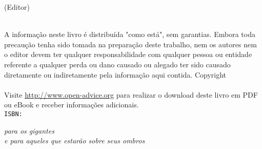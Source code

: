 \thispagestyle{empty}
\booktitle
\newpage
\newpage
\begin{titlepage}
\begin{flushright}
\bookeditor{} (Editor)\\
\vspace{10em}
{\Huge\bfseries\sffamily\booktitle}\\
\vspace{2em}
{\normalsize\sffamily\booksubtitle}
\end{flushright}
\end{titlepage}
\thispagestyle{empty}
A informação neste livro é distribuída "como está", sem garantias. Embora toda precaução tenha sido tomada na preparação deste trabalho, nem os autores nem o editor devem ter qualquer responsabilidade com qualquer pessoa ou entidade referente a qualquer perda ou dano causado ou alegado ter sido causado diretamente ou indiretamente pela informação aqui contida.%
\vfill
Copyright \textcopyright{} \bookyear{} \bookauthors\\
\newline
{}
\newline \\
Visite \url{http://www.open-advice.org} para realizar o download deste livro em PDF ou eBook e receber informações adicionais.
\newline \\
{\tt ISBN: \bookisbn}%
\newpage
\thispagestyle{empty}
\vspace*{2cm}
\begin{flushright}
{\Large\itshape para os gigantes\\e para aqueles que estarão sobre seus ombros}\\
\end{flushright}
\newpage
\thispagestyle{empty}
\mbox{}
\newpage
